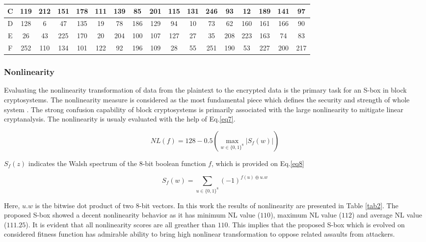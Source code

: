 \documentclass[journal]{IEEEtran/IEEEtran}
\begin{document}
\begin{table}
{\begin{tabular}{|*{17}{c|}}
	\hline
	C  & 119 & 212 & 151 & 178 & 111 & 139 & 85 & 201 & 115 & 131 & 246 & 93 & 12 & 189 & 141 & 97 \\
	
	\hline
	D  & 128 & 6 & 47 & 135 & 19 & 78 & 186 & 129 & 94 & 10 & 73 & 62 & 160 & 161 & 166 & 90 \\
	
	\hline
	E  & 26 & 43 & 225 & 170 & 20 & 204 & 100 & 107 & 127 & 27 & 35 & 208 & 223 & 163 & 74 & 83 \\
	
	\hline
	F  & 252 & 110 & 134 & 101 & 122 & 92 & 196 & 109 & 28 & 55 & 251 & 190 & 53 & 227 & 200 & 217 \\
		
	\hline
\end{tabular}
}
\end{table} 

\subsubsection{Nonlinearity}

  Evaluating the nonlinearity transformation of data from the plaintext to the encrypted data is the primary task for an S-box in block cryptosystems. The nonlinearity measure is considered as the most fundamental piece which defines the security and strength of whole system \cite{ahmad2018random}. The strong confusion capability of block cryptosystems is primarily associated with the large nonlinearity to mitigate linear cryptanalysis. The nonlinearity is usualy evaluated with the help of Eq.\ref{eq7}. 

\begin{equation}\label{eq7}
NL(f) = 128 - 0.5\left( {\mathop {\max }\limits_{w \in {{\{ 0,1\} }^8}} \left| {{S_f}(w)} \right|} \right)
\end{equation}

${S_f}\left( z \right)$  indicates the Walsh spectrum of the 8-bit boolean function $f$, which is provided on Eq.\ref{eq8}

\begin{equation}\label{eq8}
{S_f}(w) = \sum\limits_{u \in {{\{ 0,1\} }^8}} {{{( - 1)}^{f(u) \oplus u.w}}} 
\end{equation}

Here, $u.w$ is the bitwise dot product of two 8-bit vectors. In this work the results of nonlinearity are presented in Table \ref{tab2}. The proposed S-box showed a decent nonlinearity behavior as it has minimum NL value ($110$), maximum NL value ($112$) and average NL value ($111.25$). It is evident that all nonlinearity scores are all greather than $110$. This implies that the proposed S-box which is evolved on considered fitness function has admirable ability to bring high nonlinear transformation to oppose related assaults from attackers. 
\end{document}
